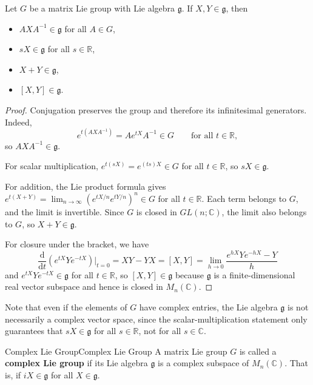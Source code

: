 \documentclass[../main.tex]{subfiles}
\begin{document}
\begin{theorem}{}{}
  Let $G$ be a matrix Lie group with Lie algebra $\mathfrak{g}$. If $X,Y \in \mathfrak{g}$, then
  \begin{itemize}
    \item $AXA^{-1} \in \mathfrak{g}$ for all $A \in G$,
    \item $sX \in \mathfrak{g}$ for all $s \in \mathbb{R}$,
    \item $X + Y \in \mathfrak{g}$,
    \item $[X,Y] \in \mathfrak{g}$.
  \end{itemize}
\end{theorem}
\begin{proof}
  Conjugation preserves the group and therefore its infinitesimal generators. Indeed,
  \begin{equation*}
    e^{t(AXA^{-1})}=Ae^{tX}A^{-1}\in G
    \qquad\text{for all }t\in\mathbb{R},
  \end{equation*}
  so $AXA^{-1}\in\mathfrak{g}$.

  For scalar multiplication, $e^{t(sX)} = e^{(ts)X} \in G$ for all $t \in \mathbb{R}$, so $sX \in \mathfrak{g}$.

  For addition, the Lie product formula gives $e^{t(X+Y)} = \lim_{n \to \infty} (e^{tX/n} e^{tY/n})^n \in G$ for all $t \in \mathbb{R}$. Each term belongs to $G$, and the limit is invertible. Since $G$ is closed in $GL(n;\mathbb{C})$, the limit also belongs to $G$, so $X+Y\in\mathfrak{g}$.

  For closure under the bracket, we have
  \begin{equation}
    \frac{\mathrm{d}}{\mathrm{d} t} (e^{tX} Y e^{-tX}) \bigg|_{t=0} = XY - YX = [X,Y] = \lim_{h \to 0} \frac{e^{hX} Y e^{-hX} - Y}{h}
  \end{equation}
  and $e^{tX} Y e^{-tX} \in \mathfrak{g}$ for all $t \in \mathbb{R}$, so $[X,Y] \in \mathfrak{g}$ because $\mathfrak{g}$ is a finite-dimensional real vector subspace and hence is closed in $M_n(\mathbb{C})$.
\end{proof}

\begin{remark}
  Note that even if the elements of $G$ have complex entries, the Lie algebra $\mathfrak{g}$ is not necessarily a complex vector space, since the scalar-multiplication statement only guarantees that $sX \in \mathfrak{g}$ for all $s \in \mathbb{R}$, not for all $s \in \mathbb{C}$.
\end{remark}

\begin{definition}{Complex Lie Group}{Complex Lie Group}
  A matrix Lie group $G$ is called a \textbf{complex Lie group} if its Lie algebra $\mathfrak{g}$ is a complex subspace of $M_n(\mathbb{C})$. That is, if $i X \in \mathfrak{g}$ for all $X \in \mathfrak{g}$.
\end{definition}
\end{document}
